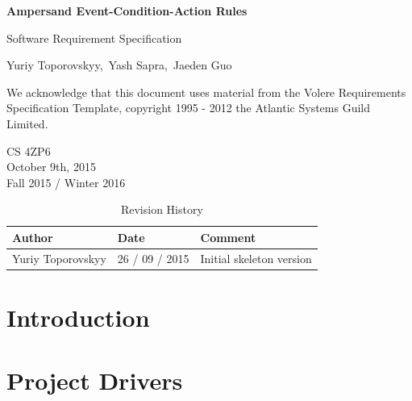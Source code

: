 \documentclass[12pt]{report}
\begin{document}
\begin{titlepage}\begin{center}
\thispagestyle{empty} %

\vspace*{1cm}

{\Huge\textbf{Ampersand Event-Condition-Action Rules}}

\vspace{0.5cm}
{\Large Software Requirement Specification 
	

\vspace{1.5cm}
Yuriy Toporovskyy,\ Yash Sapra,\ Jaeden Guo}
\vfill

We acknowledge that this document uses material from the Volere Requirements
Specification Template, copyright 1995 - 2012 the Atlantic Systems Guild
Limited.

\vspace{0.8cm}
\end{center}
CS 4ZP6 \\
October 9th, 2015 \\ 
Fall 2015 / Winter 2016 
\end{titlepage}


\begin{table}[ht!]\begin{center}
\caption{Revision History}  
\begin{tabular}{|l|l|l|}\hline
\textbf{Author} & \textbf{Date} & \textbf{Comment} \\\hline 
Yuriy Toporovskyy & 26 / 09 / 2015 & Initial skeleton version \\\hline
\end{tabular}
\end{center}\end{table}

\tableofcontents
\listoffigures
\listoftables

\newpage
{} %

{\chapter{Introduction}\label{ch:Intro}}
{\chapter{Project Drivers}\label{ch:Drivers}}
\end{document}
